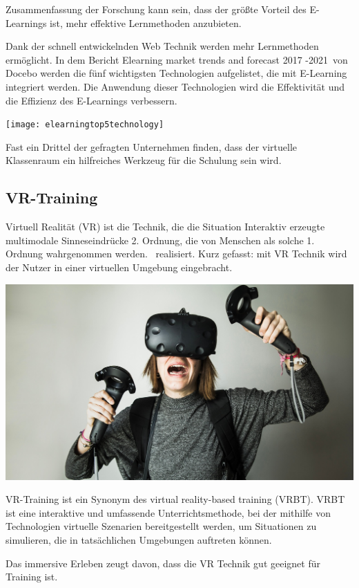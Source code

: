 Zusammenfassung der Forschung kann sein, dass der größte Vorteil des E-Learnings ist, mehr effektive Lernmethoden anzubieten.

Dank der schnell entwickelnden Web Technik werden mehr Lernmethoden ermöglicht. In dem Bericht \glqq Elearning market trends and forecast 2017 -2021\grqq\ von Docebo werden die fünf wichtigsten Technologien aufgelistet, die mit E-Learning integriert werden. Die Anwendung dieser Technologien wird die Effektivität und die Effizienz des E-Learnings verbessern.

\texttt{[image: elearningtop5technology]}

Fast ein Drittel der gefragten Unternehmen finden, dass der virtuelle Klassenraum ein hilfreiches Werkzeug für die Schulung sein wird.

 \subsection{VR-Training}
 
Virtuell Realität (VR) ist die Technik, die die Situation \glqq Interaktiv erzeugte multimodale Sinneseindrücke 2. Ordnung, die von Menschen als solche 1. Ordnung wahrgenommen werden.\grqq\ \citep{9} realisiert. Kurz gefasst: mit VR Technik wird der Nutzer in einer virtuellen Umgebung eingebracht.

\includegraphics[width=\textwidth]{images/vrhtcvive.jpg}

VR-Training ist ein Synonym des virtual reality-based training (VRBT). \glqq VRBT ist eine interaktive und umfassende Unterrichtsmethode, bei der mithilfe von Technologien virtuelle Szenarien bereitgestellt werden, um Situationen zu simulieren, die in tatsächlichen Umgebungen auftreten können. \grqq\ \citep{14}

Das immersive Erleben zeugt davon, dass die VR Technik gut geeignet für Training ist.

